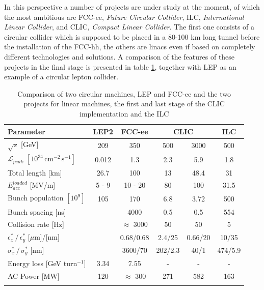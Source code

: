 In this perspective a number of projects are under study at the moment, of which the most ambitious are FCC-ee, \textit{Future Circular Collider}, ILC, \textit{International Linear Collider}, and CLIC, \textit{Compact Linear Collider}. The first one consists of a circular collider which is supposed to be placed in a 80-100 km long tunnel before the installation of the FCC-hh, the others are linacs even if based on completely different technologies and solutions.  A comparison of the features of these projects in the final stage is presented in table \ref{table_CLIC_ILC_FCC}, together with LEP as an example of a circular lepton collider.

\begin{table}
  \centering
    \begin{tabular}{ l c c | c c c }
    \hline
    \hline
    \textbf{Parameter}								& \textbf{LEP2}	&	\textbf{FCC-ee}	&  \multicolumn{2}{c}{\textbf{CLIC}}	&	\textbf{ILC}	\\
    \hline
    $\sqrt{s}$ [GeV]								& 209	& 350  			&  	500	&  3000	& 500	\\
    $\mathscr{L}_{peak}$  $[10^{34} \, \text{cm}^{-2} \, \text{s}^{-1}]$	&0.012	& 1.3				&  	2.3	& 	5.9	&1.8		\\
    Total length [km]								&26.7	& 100			& 13		&  48.4	& 31		\\
    $E_{acc}^{loaded}$ [MV/m]						& 5 - 9	& 10 - 20			& 80		& 100 	& 31.5	\\
    Bunch population $[10^9]$						& 105	& 170  			&  6.8	& 	3.72	& 500	\\
    Bunch spacing [ns]							& 		& 4000	  		&  	0.5	& 	0.5	& 554	\\
    Collision rate [Hz]								&  		&$\approx$ 3000	&  	50	& 	50	& 5		\\
    $\epsilon^*_x \, / \, \epsilon^*_y $ [$\mu$m]/[nm]		& 		&  	0.68/0.68	        		&  2.4/25	& 0.66/20	& 10/35	\\  
    $\sigma^*_x\, / \, \sigma^*_y$ [nm]				& 		&  	3600/70		&  202/2.3	& 40/1	&474/5.9	\\    
    Energy loss [GeV turn$^{-1}$]					&  3.34	& 	7.55			& - 		& -		& -		\\
    AC Power [MW]								&  120	& $\approx$ 300		& 271	& 582	& 163	\\
    \hline
    \hline
    \label{CLIC_param_table}
    \end{tabular}
  \caption{Comparison of two circular machines, LEP\cite{Aull:2156972,LEP:RF} and FCC-ee\cite{FCC-ee:leptonCollParam,Zimmermann:2057706} and the two projects for linear machines, the first and last stage of the CLIC implementation \cite{CLIC:cdr} and the ILC\cite{ILC:tdr} }\label{table_CLIC_ILC_FCC}
\end{table}



